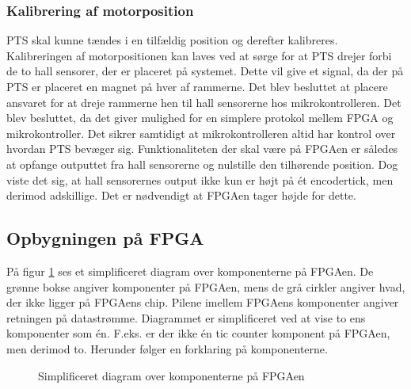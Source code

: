 \subsubsection*{Kalibrering af motorposition}
PTS skal kunne tændes i en tilfældig position og derefter kalibreres.
Kalibreringen af motorpositionen kan laves ved at sørge for at PTS drejer forbi 
de to hall sensorer, der er placeret på systemet. Dette vil give et signal, da 
der på PTS er placeret en magnet på hver af rammerne.
Det blev besluttet at placere ansvaret for at dreje rammerne hen til hall 
sensorerne hos mikrokontrolleren. Det blev besluttet, da det giver mulighed for 
en simplere protokol mellem FPGA og mikrokontroller. Det sikrer samtidigt at mikrokontrolleren 
altid har kontrol over hvordan PTS bevæger sig.
Funktionaliteten der skal være på FPGAen er således at opfange outputtet fra 
hall sensorerne og nulstille den tilhørende position.
Dog viste det sig, at hall sensorernes output ikke kun er højt på ét encodertick, 
men derimod adskillige. Det er nødvendigt at FPGAen tager højde for 
dette.

\subsection{Opbygningen på FPGA}
På figur \ref{fig:FPGA_blok} ses et simplificeret diagram over komponenterne på FPGAen. 
De grønne bokse angiver komponenter på FPGAen, mens de grå cirkler angiver hvad, der ikke ligger på 
FPGAens chip. Pilene imellem FPGAens komponenter angiver retningen på 
datastrømme. Diagrammet er simplificeret ved at vise to ens komponenter som én. 
F.eks. er der ikke én tic counter komponent på FPGAen, men derimod to.
Herunder følger en forklaring på komponenterne.

\begin{figure}[!th]
\centering
\begin{tikzpicture}[node distance = 5 cm,scale=1]

\end{tikzpicture}
\caption[Diagram over FPGA komponenter]{Simplificeret diagram over komponenterne på FPGAen}
\label{fig:FPGA_blok}
\end{figure}



